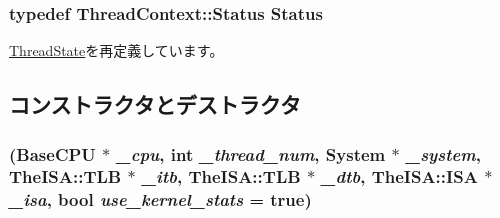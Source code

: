 \label{classSimpleThread_aaf5f073a387db0556d1db4bcc45428bc}
\hypertarget{classSimpleThread_a3af29dcea6d2bbb0a1de56f02ec789f1}{
\subsubsection[{Status}]{\setlength{\rightskip}{0pt plus 5cm}typedef {\bf ThreadContext::Status} {\bf Status}}}
\label{classSimpleThread_a3af29dcea6d2bbb0a1de56f02ec789f1}


\hyperlink{structThreadState_a3af29dcea6d2bbb0a1de56f02ec789f1}{ThreadState}を再定義しています。

\subsection{コンストラクタとデストラクタ}
\hypertarget{classSimpleThread_a1b31d6552d3e1bc9e3fe401d56a03aef}{
\subsubsection[{SimpleThread}]{ ({\bf BaseCPU} $\ast$ {\em \_\-cpu}, \/  int {\em \_\-thread\_\-num}, \/  {\bf System} $\ast$ {\em \_\-system}, \/  TheISA::TLB $\ast$ {\em \_\-itb}, \/  TheISA::TLB $\ast$ {\em \_\-dtb}, \/  TheISA::ISA $\ast$ {\em \_\-isa}, \/  bool {\em use\_\-kernel\_\-stats} = {\ttfamily true})}}
\label{classSimpleThread_a1b31d6552d3e1bc9e3fe401d56a03aef}



